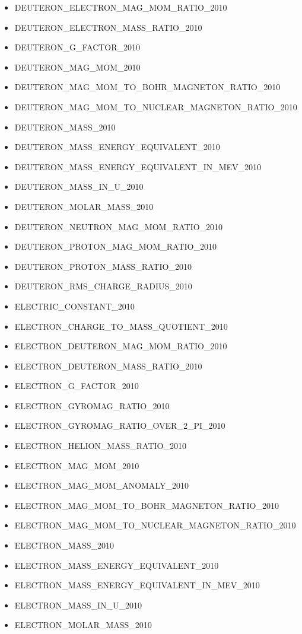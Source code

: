 \begin{itemize}
\item DEUTERON\_ELECTRON\_MAG\_MOM\_RATIO\_2010
\item DEUTERON\_ELECTRON\_MASS\_RATIO\_2010
\item DEUTERON\_G\_FACTOR\_2010
\item DEUTERON\_MAG\_MOM\_2010
\item DEUTERON\_MAG\_MOM\_TO\_BOHR\_MAGNETON\_RATIO\_2010
\item DEUTERON\_MAG\_MOM\_TO\_NUCLEAR\_MAGNETON\_RATIO\_2010
\item DEUTERON\_MASS\_2010
\item DEUTERON\_MASS\_ENERGY\_EQUIVALENT\_2010
\item DEUTERON\_MASS\_ENERGY\_EQUIVALENT\_IN\_MEV\_2010
\item DEUTERON\_MASS\_IN\_U\_2010
\item DEUTERON\_MOLAR\_MASS\_2010
\item DEUTERON\_NEUTRON\_MAG\_MOM\_RATIO\_2010
\item DEUTERON\_PROTON\_MAG\_MOM\_RATIO\_2010
\item DEUTERON\_PROTON\_MASS\_RATIO\_2010
\item DEUTERON\_RMS\_CHARGE\_RADIUS\_2010
\item ELECTRIC\_CONSTANT\_2010
\item ELECTRON\_CHARGE\_TO\_MASS\_QUOTIENT\_2010
\item ELECTRON\_DEUTERON\_MAG\_MOM\_RATIO\_2010
\item ELECTRON\_DEUTERON\_MASS\_RATIO\_2010
\item ELECTRON\_G\_FACTOR\_2010
\item ELECTRON\_GYROMAG\_RATIO\_2010
\item ELECTRON\_GYROMAG\_RATIO\_OVER\_2\_PI\_2010
\item ELECTRON\_HELION\_MASS\_RATIO\_2010
\item ELECTRON\_MAG\_MOM\_2010
\item ELECTRON\_MAG\_MOM\_ANOMALY\_2010
\item ELECTRON\_MAG\_MOM\_TO\_BOHR\_MAGNETON\_RATIO\_2010
\item ELECTRON\_MAG\_MOM\_TO\_NUCLEAR\_MAGNETON\_RATIO\_2010
\item ELECTRON\_MASS\_2010
\item ELECTRON\_MASS\_ENERGY\_EQUIVALENT\_2010
\item ELECTRON\_MASS\_ENERGY\_EQUIVALENT\_IN\_MEV\_2010
\item ELECTRON\_MASS\_IN\_U\_2010
\item ELECTRON\_MOLAR\_MASS\_2010

\end{itemize}
